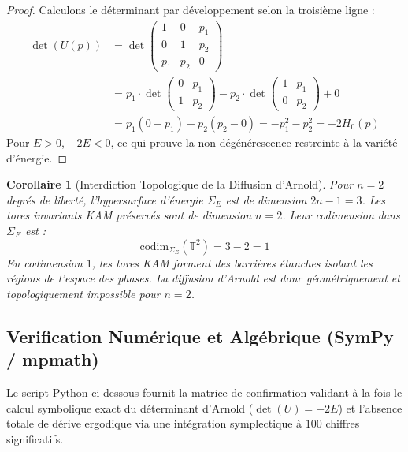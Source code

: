 \documentclass[10pt,twocolumn,a4paper]{article}
\newtheorem{corollary}[theorem]{Corollaire}
\begin{document}
\begin{proof}
Calculons le déterminant par développement selon la troisième ligne :
\begin{align*}
\det(U(p)) &= \det \begin{pmatrix} 1 & 0 & p_1 \\ 0 & 1 & p_2 \\ p_1 & p_2 & 0 \end{pmatrix} \\
&= p_1 \cdot \det \begin{pmatrix} 0 & p_1 \\ 1 & p_2 \end{pmatrix} - p_2 \cdot \det \begin{pmatrix} 1 & p_1 \\ 0 & p_2 \end{pmatrix} + 0 \\
&= p_1(0 - p_1) - p_2(p_2 - 0) = -p_1^2 - p_2^2 = -2 H_0(p)
\end{align*}
Pour $E > 0$, $-2E < 0$, ce qui prouve la non-dégénérescence restreinte à la variété d'énergie.
\end{proof}

\begin{corollary}[Interdiction Topologique de la Diffusion d'Arnold]
Pour $n = 2$ degrés de liberté, l'hypersurface d'énergie $\Sigma_E$ est de dimension $2n - 1 = 3$. Les tores invariants KAM préservés sont de dimension $n = 2$. Leur codimension dans $\Sigma_E$ est :
\begin{equation}
\mathrm{codim}_{\Sigma_E}(\mathbb{T}^2) = 3 - 2 = 1
\end{equation}
En codimension $1$, les tores KAM forment des barrières étanches isolant les régions de l'espace des phases. La diffusion d'Arnold est donc géométriquement et topologiquement impossible pour $n = 2$.
\end{corollary}

\subsection{Verification Numérique et Algébrique (SymPy / mpmath)}

Le script Python ci-dessous fournit la matrice de confirmation validant à la fois le calcul symbolique exact du déterminant d'Arnold ($\det(U) = -2E$) et l'absence totale de dérive ergodique via une intégration symplectique à $100$ chiffres significatifs.
\end{document}
